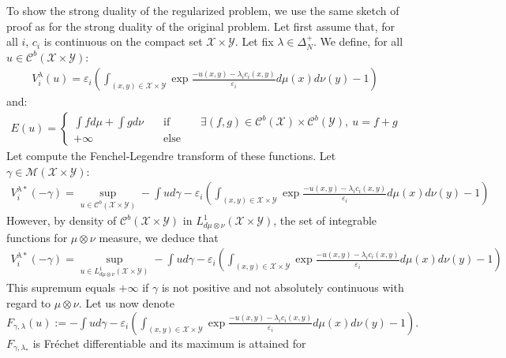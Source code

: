 \begin{prv*}
To show the strong duality of the regularized problem, we use the same sketch of proof as for the strong duality of the original problem. 
\medskip
Let first assume that, for all $i$, $c_i$ is continuous on the compact set $\mathcal{X}\times\mathcal{Y}$. Let fix $\lambda\in\Delta^+_N$. We define, for all $u\in\mathcal{C}^b(\mathcal{X}\times\mathcal{Y})$:
\begin{align*}
    V^\lambda_i(u) = \varepsilon_i\left(\int_{(x,y)\in\mathcal{X}\times\mathcal{Y}} \exp{\frac{-u(x,y)-\lambda_ic_i(x,y)}{\varepsilon_i}}d\mu(x)d\nu(y)-1\right)
\end{align*}
and:
\begin{align*}
E(u)=\left\{\begin{matrix} \int fd\mu+\int gd\nu &\quad\text{if}\quad& \exists (f,g)\in \mathcal{C}^b(\mathcal{X})\times\mathcal{C}^b(\mathcal{Y}),~ u = f+g\\
+\infty &\quad\text{else}\quad&\end{matrix}\right.
\end{align*}
Let compute the Fenchel-Legendre transform of these functions. Let $\gamma\in\mathcal{M}(\mathcal{X}\times\mathcal{Y})$:
\begin{align*}
    V^{\lambda*}_i(-\gamma) = \sup_{u\in\mathcal{C}^b(\mathcal{X}\times\mathcal{Y})}-\int ud\gamma -\varepsilon_i\left(\int_{(x,y)\in\mathcal{X}\times\mathcal{Y}} \exp{\frac{-u(x,y)-\lambda_ic_i(x,y)}{\varepsilon_i}}d\mu(x)d\nu(y)-1\right) 
\end{align*}
However, by density of $\mathcal{C}^b(\mathcal{X}\times\mathcal{Y})$ in $L^1_{d\mu\otimes\nu}(\mathcal{X}\times\mathcal{Y})$, the set of integrable functions for $\mu\otimes\nu$ measure, we deduce that
\begin{align*}
    V^{\lambda*}_i(-\gamma) = \sup_{u\in L^1_{d\mu\otimes\nu}(\mathcal{X}\times\mathcal{Y})}-\int ud\gamma -\varepsilon_i\left(\int_{(x,y)\in\mathcal{X}\times\mathcal{Y}} \exp{\frac{-u(x,y)-\lambda_ic_i(x,y)}{\varepsilon_i}}d\mu(x)d\nu(y)-1\right) 
\end{align*}
This supremum equals $+\infty$ if $\gamma$ is not positive and not absolutely continuous with regard to $\mu\otimes \nu$. Let us now denote 
$F_{\gamma,\lambda}(u):=-\int ud\gamma -\varepsilon_i\left(\int_{(x,y)\in\mathcal{X}\times\mathcal{Y}} \exp{\frac{-u(x,y)-\lambda_ic_i(x,y)}{\varepsilon_i}}d\mu(x)d\nu(y)-1\right).$
$F_{\gamma,\lambda_*}$ is Fréchet differentiable and its maximum is attained for 

\end{prv*}
